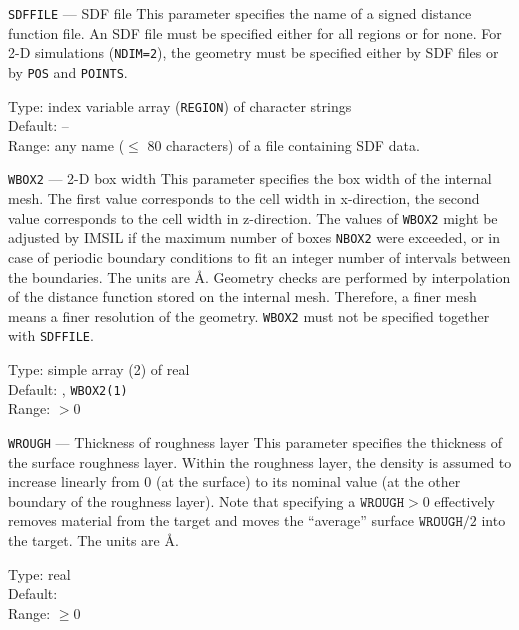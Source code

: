 \begin{keydescription}{\texttt{SDFFILE} --- SDF file}
%
  This parameter specifies the name of a signed distance function file. 
  An SDF file must be specified either for all regions or for none. For
  2-D simulations (\texttt{NDIM=2}), the geometry must be specified
  either by SDF files or by \texttt{POS} and \texttt{POINTS}.
  \begin{keytab}
    Type:    \> index variable array (\texttt{REGION}) of character
                strings  \\
    Default: \> -- \\
    Range:   \> any name ($\le$ 80 characters) of a file containing 
                SDF data.
  \end{keytab}
\end{keydescription}

\begin{keydescription}{\texttt{WBOX2} --- 2-D box width}
%
  This parameter specifies the box width of the internal mesh. The first 
  value corresponds to the cell width in x-direction, the second value 
  corresponds to the cell width in z-direction. The values of 
  \texttt{WBOX2} might be adjusted by IMSIL if the maximum number of boxes
  \texttt{NBOX2} were exceeded, or in case of periodic boundary conditions
  to fit an integer number of intervals between the boundaries. The units 
  are \AA.  Geometry checks are performed by interpolation of the distance
  function stored on the internal mesh. Therefore, a finer mesh means a finer
  resolution of the geometry. \texttt{WBOX2} must not be specified together
  with \texttt{SDFFILE}.
  \begin{keytab}
    Type:    \> simple array (2) of real \\
    Default: , \texttt{WBOX2(1)} \\
    Range:   \> $> 0$
  \end{keytab}
\end{keydescription}

\begin{keydescription}{\texttt{WROUGH} --- Thickness of roughness layer}
%
  This parameter specifies the thickness of the surface roughness layer.
  Within the roughness layer, the density is assumed to increase linearly
  from 0 (at the surface) to its nominal value (at the other boundary of the
  roughness layer). Note that specifying a $\texttt{WROUGH} > 0$ effectively
  removes material from the target and moves the ``average'' surface
  $\texttt{WROUGH}/2$ into the target. The units are \AA. 
  \begin{keytab}
    Type:    \> real \\
    Default:  \\
    Range:   \> $\ge 0$
  \end{keytab}
\end{keydescription}

